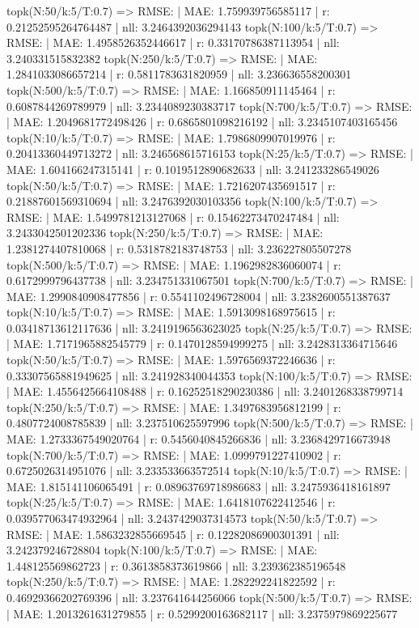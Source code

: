 topk(N:50/k:5/T:0.7) => RMSE: | MAE: 1.759939756585117 | r: 0.21252595264764487 | nll: 3.2464392036294143
topk(N:100/k:5/T:0.7) => RMSE: | MAE: 1.4958526352446617 | r: 0.33170786387113954 | nll: 3.240331515832382
topk(N:250/k:5/T:0.7) => RMSE: | MAE: 1.2841033086657214 | r: 0.5811783631820959 | nll: 3.236636558200301
topk(N:500/k:5/T:0.7) => RMSE: | MAE: 1.166850911145464 | r: 0.6087844269789979 | nll: 3.2344089230383717
topk(N:700/k:5/T:0.7) => RMSE: | MAE: 1.2049681772498426 | r: 0.6865801098216192 | nll: 3.2345107403165456
topk(N:10/k:5/T:0.7) => RMSE: | MAE: 1.7986809907019976 | r: 0.20413360449713272 | nll: 3.246568615716153
topk(N:25/k:5/T:0.7) => RMSE: | MAE: 1.604166247315141 | r: 0.1019512890682633 | nll: 3.241233286549026
topk(N:50/k:5/T:0.7) => RMSE: | MAE: 1.7216207435691517 | r: 0.21887601569310694 | nll: 3.2476392030103356
topk(N:100/k:5/T:0.7) => RMSE: | MAE: 1.5499781213127068 | r: 0.15462273470247484 | nll: 3.2433042501202336
topk(N:250/k:5/T:0.7) => RMSE: | MAE: 1.2381274407810068 | r: 0.5318782183748753 | nll: 3.236227805507278
topk(N:500/k:5/T:0.7) => RMSE: | MAE: 1.1962982836060074 | r: 0.6172999796437738 | nll: 3.234751331067501
topk(N:700/k:5/T:0.7) => RMSE: | MAE: 1.2990840908477856 | r: 0.5541102496728004 | nll: 3.2382600551387637
topk(N:10/k:5/T:0.7) => RMSE: | MAE: 1.5913098168975615 | r: 0.03418713612117636 | nll: 3.2419196563623025
topk(N:25/k:5/T:0.7) => RMSE: | MAE: 1.7171965882545779 | r: 0.1470128594999275 | nll: 3.2428313364715646
topk(N:50/k:5/T:0.7) => RMSE: | MAE: 1.5976569372246636 | r: 0.33307565881949625 | nll: 3.241928340044353
topk(N:100/k:5/T:0.7) => RMSE: | MAE: 1.4556425664108488 | r: 0.16252518290230386 | nll: 3.2401268338799714
topk(N:250/k:5/T:0.7) => RMSE: | MAE: 1.3497683956812199 | r: 0.4807724008785839 | nll: 3.237510625597996
topk(N:500/k:5/T:0.7) => RMSE: | MAE: 1.2733367549020764 | r: 0.5456040845266836 | nll: 3.2368429716673948
topk(N:700/k:5/T:0.7) => RMSE: | MAE: 1.0999791227410902 | r: 0.6725026314951076 | nll: 3.233533663572514
topk(N:10/k:5/T:0.7) => RMSE: | MAE: 1.815141106065491 | r: 0.08963769718986683 | nll: 3.2475936418161897
topk(N:25/k:5/T:0.7) => RMSE: | MAE: 1.6418107622412546 | r: 0.039577063474932964 | nll: 3.2437429037314573
topk(N:50/k:5/T:0.7) => RMSE: | MAE: 1.5863232855669545 | r: 0.12282086900301391 | nll: 3.242379246728804
topk(N:100/k:5/T:0.7) => RMSE: | MAE: 1.448125569862723 | r: 0.3613858373619866 | nll: 3.239362385196548
topk(N:250/k:5/T:0.7) => RMSE: | MAE: 1.282292241822592 | r: 0.46929366202769396 | nll: 3.237641644256066
topk(N:500/k:5/T:0.7) => RMSE: | MAE: 1.2013261631279855 | r: 0.5299200163682117 | nll: 3.2375979869225677
